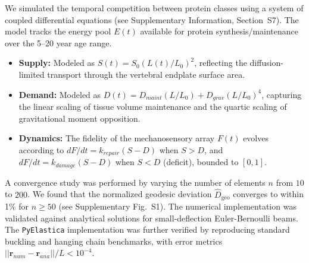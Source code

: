 \documentclass[11pt]{article}
\begin{document}
We simulated the temporal competition between protein classes using a system of coupled differential equations (see Supplementary Information, Section~S7). The model tracks the energy pool $E(t)$ available for protein synthesis/maintenance over the 5--20 year age range.
\begin{itemize}
    \item \textbf{Supply:} Modeled as $S(t) = S_0 (L(t)/L_0)^2$, reflecting the diffusion-limited transport through the vertebral endplate surface area.
    \item \textbf{Demand:} Modeled as $D(t) = D_{maint} (L/L_0) + D_{grav} (L/L_0)^4$, capturing the linear scaling of tissue volume maintenance and the quartic scaling of gravitational moment opposition.
    \item \textbf{Dynamics:} The fidelity of the mechanosensory array $F(t)$ evolves according to $dF/dt = k_{repair}(S - D)$ when $S > D$, and $dF/dt = k_{damage}(S - D)$ when $S < D$ (deficit), bounded to $[0, 1]$.
\end{itemize}



A convergence study was performed by varying the number of elements $n$ from $10$ to $200$. We found that the normalized geodesic deviation $\widehat{D}_{\mathrm{geo}}$ converges to within 1\% for $n \geq 50$ (see Supplementary Fig.~S1). The numerical implementation was validated against analytical solutions for small-deflection Euler-Bernoulli beams. The \texttt{PyElastica} implementation was further verified by reproducing standard buckling and hanging chain benchmarks, with error metrics $||\mathbf{r}_{num} - \mathbf{r}_{ana}||/L < 10^{-4}$.



\end{document}
